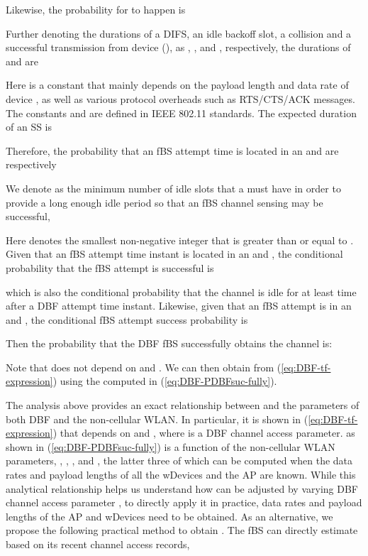 \documentclass[journal,final,letterpaper,10pt,doublecolumn,twoside]{IEEEtran}
\begin{document}
Likewise, the probability for  to happen is



Further denoting the durations of a DIFS, an idle backoff slot,  a
collision and a successful transmission from device  (), as , ,  and , respectively,
the durations of  and  are

Here  is a constant that mainly depends on the payload
length and data rate of device , as well as various protocol
overheads such as RTS/CTS/ACK messages. The constants  and
 are defined in IEEE 802.11 standards. The expected duration of
an SS is

Therefore, the probability that an fBS attempt time is located in an
 and  are respectively


We denote  as the minimum number of idle slots that a  must have in order to provide a long enough idle period so that an fBS channel sensing may be successful,

Here  denotes the smallest non-negative integer that is
greater than or equal to .
Given that an fBS attempt time instant is located in an  and , the conditional probability that the fBS attempt is successful is

which is also the conditional probability that the channel is idle for at least  time after a DBF attempt time instant.
Likewise, given that an fBS attempt is in an  and , the conditional fBS attempt success probability is


Then the probability that the DBF fBS successfully obtains the channel
is:


Note that  does not depend on
 and . We can then obtain
 from (\ref{eq:DBF-tf-expression}) using the
 computed in (\ref{eq:DBF-PDBFsuc-fully}).

The analysis above provides an exact relationship between  and the parameters of
both DBF and the non-cellular WLAN.
In particular, it is shown in (\ref{eq:DBF-tf-expression}) that
 depends on  and , where  is a
DBF channel access parameter.  as shown in
(\ref{eq:DBF-PDBFsuc-fully}) is a function of the non-cellular WLAN
parameters, , , ,  and , the
latter three of which can be computed when the data rates and
payload lengths of all the wDevices and the AP are known. While this
analytical relationship helps us understand how  can be
adjusted by varying DBF channel access parameter , to directly apply it
in practice, data rates and payload lengths of the AP and wDevices need
to be obtained.  As an alternative, we propose the following
practical method to obtain . The fBS can
directly estimate  based on its recent channel
access records,
\end{document}

